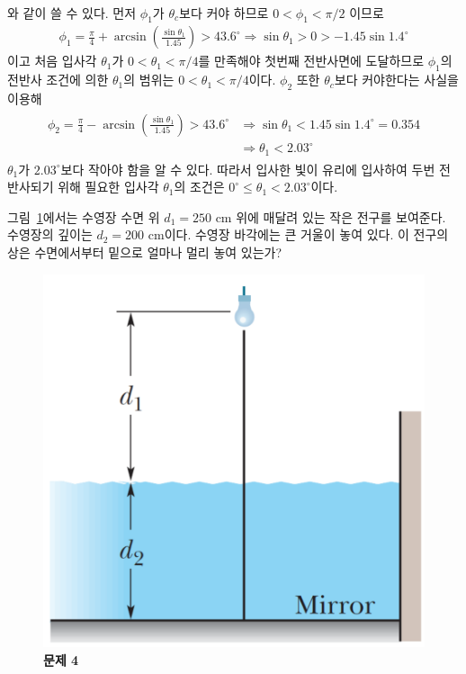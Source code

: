 \documentclass[tightenlines,floatfix,nofootinbib,superscriptaddress,fleqn]{revtex4-2}
\begin{document}
\begin{itemize}
\begin{align}
  \end{align}
  와 같이 쓸 수 있다. 먼저 $\phi_1$가 $\theta_c$보다 커야 하므로
  $0<\phi_1<\pi/2$ 이므로 
  \begin{align}
    \phi_1 = \frac{\pi}{4}
    +\arcsin\left(\frac{\sin\theta_1}{1.45}\right)
    >43.6^\circ \Longrightarrow
    \sin\theta_1>0>-1.45\sin1.4^\circ
  \end{align}
  이고 처음 입사각 $\theta_1$가 $0<\theta_1<\pi/4$를 만족해야 첫번째 전반사면에
  도달하므로 $\phi_1$의 전반사 조건에 의한 $\theta_1$의 범위는
  $0<\theta_1<\pi/4$이다. $\phi_2$ 또한 $\theta_c$보다 커야한다는 사실을 이용해
  \begin{align}
    \begin{split}
      \phi_2 =  \frac{\pi}{4}
      -\arcsin\left(\frac{\sin\theta_1}{1.45}\right)
      >43.6^\circ &\Longrightarrow
      \sin\theta_1<1.45\sin1.4^\circ = 0.354 \\
      &\Longrightarrow\theta_1 < 2.03^\circ
    \end{split}
  \end{align}
  $\theta_1$가 $2.03^\circ$보다 작아야 함을 알 수 있다. 따라서 입사한 빛이 유리에 입사하여
  두번 전반사되기 위해 필요한 입사각 $\theta_1$의 조건은 $0^\circ\leq \theta_1
  <2.03^\circ$이다.
\end{itemize}
 

\vspace{1cm}


그림~\ref{fig:2}에서는 수영장 수면 위 $d_1=250$ cm 위에 매달려 있는
작은 전구를 보여준다. 수영장의 깊이는 $d_2=200$ cm이다. 수영장
바각에는 큰 거울이 놓여 있다. 이 전구의 상은 수면에서부터 밑으로 얼마나 멀리
놓여 있는가? 
\begin{figure}[htp]
  \centering
  \includegraphics[scale=0.35]{qfig13-4-20221031.pdf} 
  \caption{\textbf{문제 4}}
  \label{fig:2}
\end{figure}
\end{document}
